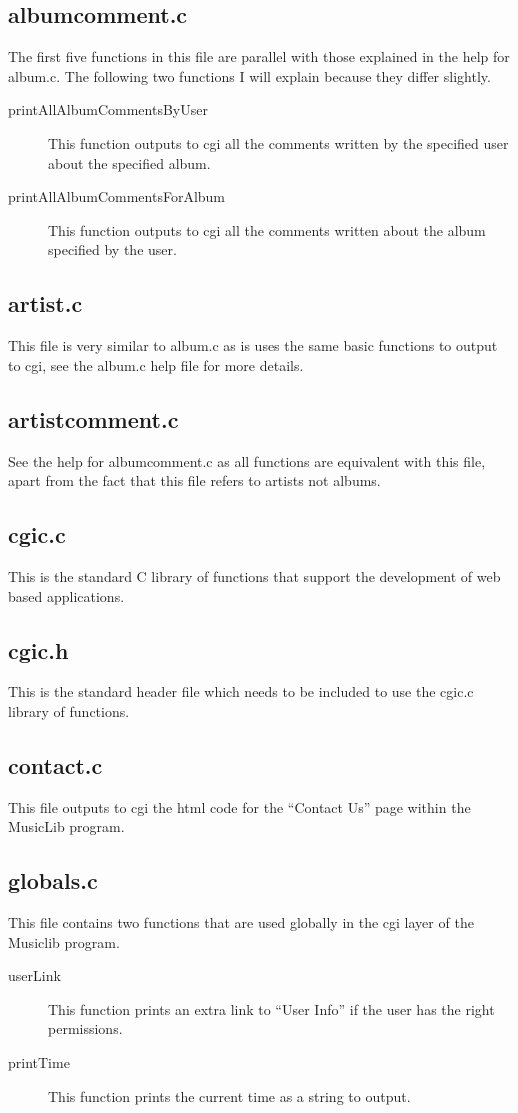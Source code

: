 \documentclass{article}
\begin{document}
\subsection{albumcomment.c}
The first five functions in this file are parallel with those explained in the help for album.c. The following two functions I will explain because they differ slightly.
\begin{description}
\item[printAllAlbumCommentsByUser]
This function outputs to cgi all the comments written by the specified user about the specified album.
\item[printAllAlbumCommentsForAlbum]
This function outputs to cgi all the comments written about the album specified by the user.
\end{description}

\subsection{artist.c}
This file is very similar to album.c as is uses the same basic functions to output to cgi, see the album.c help file for more details. 

\subsection{artistcomment.c}
See the help for albumcomment.c as all functions are equivalent with this file, apart from the fact that this file refers to artists not albums.

\subsection{cgic.c}
This is the standard C library of functions that support the development of web based applications.

\subsection{cgic.h}
This is the standard header file which needs to be included to use the cgic.c library of functions.

\subsection{contact.c}
This file outputs to cgi the html code for the ``Contact Us'' page within the MusicLib program.

\subsection{globals.c}
This file contains two functions that are used globally in the cgi layer of the Musiclib program. 
\begin{description}
\item[userLink] This function prints an extra link to ``User Info'' if the user has the right permissions.
\item[printTime] This function prints the current time as a string to output.
\end{description}
\end{document}
